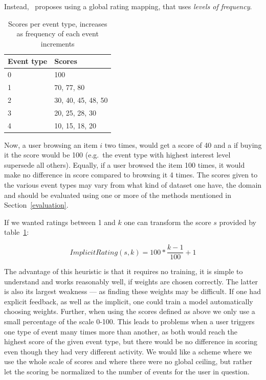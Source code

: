 Instead,~\cite{pkghost2014implicit} proposes using a global rating mapping,
that uses \textit{levels of frequency}.

\begin{table}[H]
  \centering
  \begin{tabular}{ll}
  \toprule
  Event type & Scores \\ \midrule
  0 & 100 \\
  1 & 70, 77, 80 \\
  2 & 30, 40, 45, 48, 50 \\
  3 & 20, 25, 28, 30 \\
  4 & 10, 15, 18, 20 \\
  \bottomrule
  \end{tabular}
  \caption{Scores per event type, increases as frequency of each event
           increments}
\label{implicit-table}
\end{table}

Now, a user browsing an item $i$ two times, would get a score of 40 and a if
buying it the score would be 100 (e.g.\ the event type with highest interest
level supersede all others). Equally, if a user browsed the item 100 times, it
would make no difference in score compared to browsing it 4 times. The scores
given to the various event types may vary from what kind of dataset one have,
the domain and should be evaluated using one or more of the methods mentioned
in Section~\ref{evaluation}.

If we wanted ratings between 1 and $k$ one can transform the score $s$ provided
by table~\ref{implicit-table}:

\begin{equation}
  ImplicitRating(s, k) = 100 * \frac{k-1}{100} + 1
\end{equation}

The advantage of this heuristic is that it requires no training, it is simple
to understand and works reasonably well, if weights are chosen correctly.
The latter is also its largest weakness --- as finding these weights may be
difficult. If one had explicit feedback, as well as the implicit, one could
train a model automatically choosing weights. Further, when using the scores
defined as above we only use a small percentage of the scale 0-100. This leads
to problems when a user triggers one type of event many times more than
another, as both would reach the highest score of the given event type, but
there would be no difference in scoring even though they had very different
activity. We would like a scheme where we use the whole scale of scores and
where there were no global ceiling, but rather let the scoring be normalized to
the number of events for the user in question.

